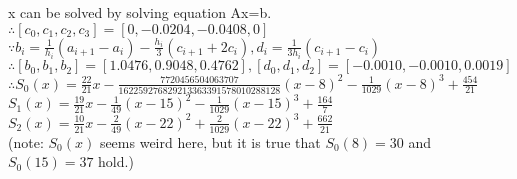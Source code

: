 \documentclass[a4paper]{article}
\begin{document}
x can be solved by solving equation Ax=b.\\
$\therefore [c_0, c_1, c_2, c_3] = [0, -0.0204, -0.0408, 0]$\\
$\because b_i = \frac{1}{h_i}(a_{i+1}-a_i)-\frac{h_i}{3}(c_{i+1}+2c_i), d_i = \frac{1}{3h_i}(c_{i+1} - c_i)$\\
$\therefore [b_0, b_1, b_2] = [1.0476, 0.9048, 0.4762], [d_0, d_1, d_2] = [-0.0010, -0.0010, 0.0019]$\\
$\therefore S_0(x) = \frac{22}{21}x -\frac{7720456504063707}{162259276829213363391578010288128}(x - 8)^2 -\frac{1}{1029}(x - 8)^3 + \frac{454}{21}$\\
$S_1(x) = \frac{19}{21}x -\frac{1}{49}(x - 15)^2 -\frac{1}{1029}(x - 15)^3 +\frac{164}{7}$\\
$S_2(x) = \frac{10}{21}x -\frac{2}{49}(x - 22)^2 + \frac{2}{1029}(x - 22)^3 + \frac{662}{21}$\\
(note: $S_0(x)$ seems weird here, but it is true that $S_0(8)=30$ and $S_0(15)=37$ hold.)
\end{document}
